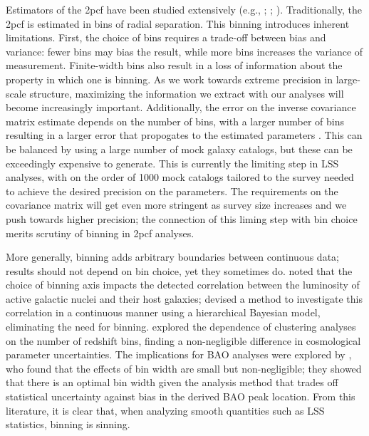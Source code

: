 \documentclass[modern]{aastex62}
\newcommand{\cf}{2pcf\xspace} %
\begin{document}
Estimators of the \cf have been studied extensively (e.g., \citealt{PeeblesHauser1974}; \citealt{DavisPeebles1983}; \citealt{Hamilton1993}).
Traditionally, the \cf is estimated in bins of radial separation.
This binning introduces inherent limitations.
First, the choice of bins requires a trade-off between bias and variance: fewer bins may bias the result, while more bins increases the variance of measurement.
Finite-width bins also result in a loss of information about the property in which one is binning.
As we work towards extreme precision in large-scale structure, maximizing the information we extract with our analyses will become increasingly important.
Additionally, the error on the inverse covariance matrix estimate depends on the number of bins, with a larger number of bins resulting in a larger error that propogates to the estimated parameters \citep{Hartlap2007, Percival2014}.
This can be balanced by using a large number of mock galaxy catalogs, but these can be exceedingly expensive to generate.
This is currently the limiting step in LSS analyses, with on the order of 1000 mock catalogs tailored to the survey needed to achieve the desired precision on the parameters.
The requirements on the covariance matrix will get even more stringent as survey size increases and we push towards higher precision; the connection of this liming step with bin choice merits scrutiny of binning in \cf analyses.

More generally, binning adds arbitrary boundaries between continuous data; results should not depend on bin choice, yet they sometimes do.
\cite{Lanzuisi2017} noted that the choice of binning axis impacts the detected correlation between the luminosity of active galactic nuclei and their host galaxies; \cite{Grimmett2020} devised a method to investigate this correlation in a continuous manner using a hierarchical Bayesian model, eliminating the need for binning.
\cite{Bailoni2016} explored the dependence of clustering analyses on the number of redshift bins, finding a non-negligible difference in cosmological parameter uncertainties.
The implications for BAO analyses were explored by \cite{Percival2014}, who found that the effects of bin width are small but non-negligible; they showed that there is an optimal bin width given the analysis method that trades off statistical uncertainty against bias in the derived BAO peak location.
From this literature, it is clear that, when analyzing smooth quantities such as LSS statistics, binning is sinning.
\end{document}
